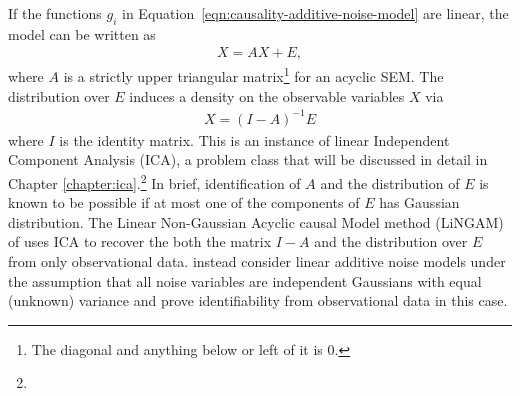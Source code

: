 If the functions $g_i$ in Equation~\ref{eqn:causality-additive-noise-model} are linear, the model can be written as
%
\begin{align}\label{eqn:causality-linear-additive-noise-model}
X = AX + E,
\end{align}
%
where $A$ is a strictly upper triangular matrix\footnote{The diagonal and anything below or left of it is 0.} for an acyclic SEM. 
The distribution over $E$ induces a density on the observable variables $X$ via
%
\begin{align*}
X = (I-A)^{-1} E
\end{align*}
%
where $I$ is the identity matrix. 
This is an instance of linear Independent Component Analysis (ICA), a problem class that will be discussed in detail in Chapter \ref{chapter:ica}.\footnote{}
In brief, identification of $A$ and the distribution of $E$ is known to be possible if at most one of the components of $E$ has Gaussian distribution.
The Linear Non-Gaussian Acyclic causal Model method (LiNGAM) of \cite{shimizu2006linear} uses ICA to recover the both the matrix $I-A$ and the distribution over $E$ from only observational data.
\cite{peters2013identifiability} instead consider linear additive noise models under the assumption that all noise variables are independent Gaussians with equal (unknown) variance and prove identifiability from observational data in this case. 

